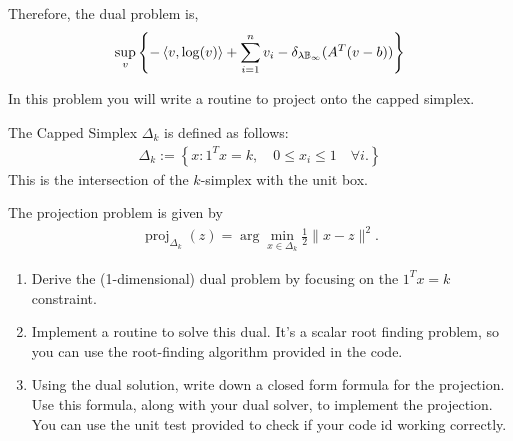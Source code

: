 \documentclass[10pt]{article}
\DeclareMathOperator*{\proj}{\operatorname{proj}}
\begin{document}
\begin{solution}[Solution]
\begin{enumerate}[label=(\alph*)]
        Therefore, the dual problem is,
        \begin{align*}
            \sup_v \left\{ 
            - \left\langle v,\log(v) \right\rangle + \sum_{i=1}^{n} v_i
            - \delta_{\lambda \mathbb{B}_{\infty}}(A^T(v-b))
            \right\}
        \end{align*}
        

\end{enumerate}
\end{solution}

\begin{problem}[Problem 5]
In this problem you will write a routine to project onto the capped simplex. 

The Capped Simplex \( \Delta_k \) is defined as follows: 
\begin{align*}
    \Delta_k := \left\{x: 1^Tx = k, \quad 0 \leq x_i \leq 1 \quad \forall i. \right\}
\end{align*}
This is the intersection of the \( k \)-simplex with the unit box. 

The projection problem is given by 
\begin{align*}
    \proj_{\Delta_k}(z) = \arg\min_{x \in \Delta_k} \frac{1}{2}\|x-z\|^2.
\end{align*}
\begin{enumerate}[label=(\alph*),nolistsep]
\item Derive the (1-dimensional) dual problem by focusing on the \( 1^Tx = k \) constraint. 
\item Implement a routine to solve this dual. It's a scalar root finding problem, 
so you can use the root-finding algorithm provided in the code.  
\item Using the dual solution, write down a closed form formula for the projection.  
Use this formula, along with your dual solver, to implement the projection. You can use the unit test 
provided to check if your code id working correctly. 

\end{enumerate}
\end{problem}
\end{document}
